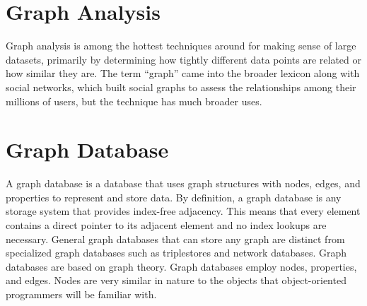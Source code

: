 
\newpage
\section{Graph Analysis}
Graph analysis is among the hottest techniques around for making sense of large datasets, primarily by determining how tightly different data points are related or how similar they are. The term “graph” came into the broader lexicon along with social networks, which built social graphs to assess the relationships among their millions of users, but the technique has much broader uses.
\section{Graph Database}

A graph database is a database that uses graph structures with nodes, edges, and properties to represent and store data. By definition, a graph database is any storage system that provides index-free adjacency. This means that every element contains a direct pointer to its adjacent element and no index lookups are necessary. General graph databases that can store any graph are distinct from specialized graph databases such as triplestores and network databases.
Graph databases are based on graph theory. Graph databases employ nodes, properties, and edges. Nodes are very similar in nature to the objects that object-oriented programmers will be familiar with.
